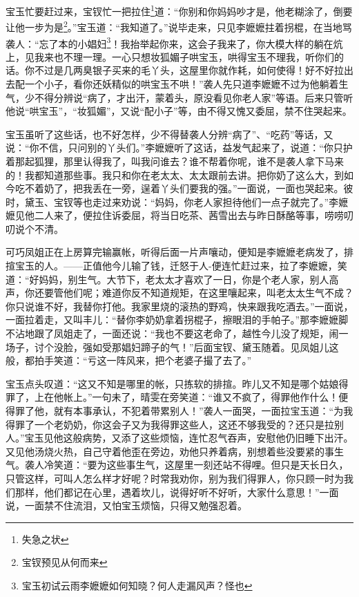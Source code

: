 \documentclass[12pt,oneside]{book}
\begin{document}
宝玉忙要赶过来，宝钗忙一把拉住\footnote{失急之状}道：“你别和你妈妈吵才是，他老糊涂了，倒要让他一步为是\footnote{宝钗预见从何而来}。”宝玉道：“我知道了。”说毕走来，只见李嬷嬷拄着拐棍，在当地骂袭人：“忘了本的小娼妇\footnote{宝玉初试云雨李嬷嬷如何知晓？何人走漏风声？怪也 }！我抬举起你来，这会子我来了，你大模大样的躺在炕上，见我来也不理一理。一心只想妆狐媚子哄宝玉，哄得宝玉不理我，听你们的话。你不过是几两臭银子买来的毛丫头，这屋里你就作耗，如何使得！好不好拉出去配一个小子，看你还妖精似的哄宝玉不哄！”袭人先只道李嬷嬷不过为他躺着生气，少不得分辨说“病了，才出汗，蒙着头，原没看见你老人家”等语。后来只管听他说“哄宝玉”，“妆狐媚”，又说“配小子”等，由不得又愧又委屈，禁不住哭起来。

宝玉虽听了这些话，也不好怎样，少不得替袭人分辨“病了”、“吃药”等话，又说：“你不信，只问别的丫头们。”李嬷嬷听了这话，益发气起来了，说道：“你只护着那起狐狸，那里认得我了，叫我问谁去？谁不帮着你呢，谁不是袭人拿下马来的！我都知道那些事。我只和你在老太太、太太跟前去讲。把你奶了这么大，到如今吃不着奶了，把我丢在一旁，逞着丫头们要我的强。”一面说，一面也哭起来。彼时，黛玉、宝钗等也走过来劝说：“妈妈，你老人家担待他们一点子就完了。”李嬷嬷见他二人来了，便拉住诉委屈，将当日吃茶、茜雪出去与昨日酥酪等事，唠唠叨叨说个不清。

可巧凤姐正在上房算完输赢帐，听得后面一片声嚷动，便知是李嬷嬷老病发了，排揎宝玉的人。——正值他今儿输了钱，迁怒于人-便连忙赶过来，拉了李嬷嬷，笑道：“好妈妈，别生气。大节下，老太太才喜欢了一日，你是个老人家，别人高声，你还要管他们呢；难道你反不知道规矩，在这里嚷起来，叫老太太生气不成？你只说谁不好，我替你打他。我家里烧的滚热的野鸡，快来跟我吃酒去。”一面说，一面拉着走，又叫丰儿：“替你李奶奶拿着拐棍子，擦眼泪的手帕子。”那李嬷嬷脚不沾地跟了凤姐走了，一面还说：“我也不要这老命了，越性今儿没了规矩，闹一场子，讨个没脸，强如受那娼妇蹄子的气！”后面宝钗、黛玉随着。见凤姐儿这般，都拍手笑道：“亏这一阵风来，把个老婆子撮了去了。”

宝玉点头叹道：“这又不知是哪里的帐，只拣软的排揎。昨儿又不知是哪个姑娘得罪了，上在他帐上。”一句未了，晴雯在旁笑道：“谁又不疯了，得罪他作什么！便得罪了他，就有本事承认，不犯着带累别人！”袭人一面哭，一面拉宝玉道：“为我得罪了一个老奶奶，你这会子又为我得罪这些人，这还不够我受的？还只是拉别人。”宝玉见他这般病势，又添了这些烦恼，连忙忍气吞声，安慰他仍旧睡下出汗。又见他汤烧火热，自己守着他歪在旁边，劝他只养着病，别想着些没要紧的事生气。袭人冷笑道：“要为这些事生气，这屋里一刻还站不得哩。但只是天长日久，只管这样，可叫人怎么样才好呢？时常我劝你，别为我们得罪人，你只顾一时为我们那样，他们都记在心里，遇着坎儿，说得好听不好听，大家什么意思！”一面说，一面禁不住流泪，又怕宝玉烦恼，只得又勉强忍着。
\end{document}
